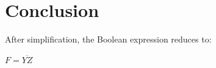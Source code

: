 \documentclass[a4paper,12pt]{article}
\begin{document}
\section*{Conclusion}

After simplification, the Boolean expression reduces to:

\begin{center}
$F = \overline{YZ}$
\end{center}
\end{document}
